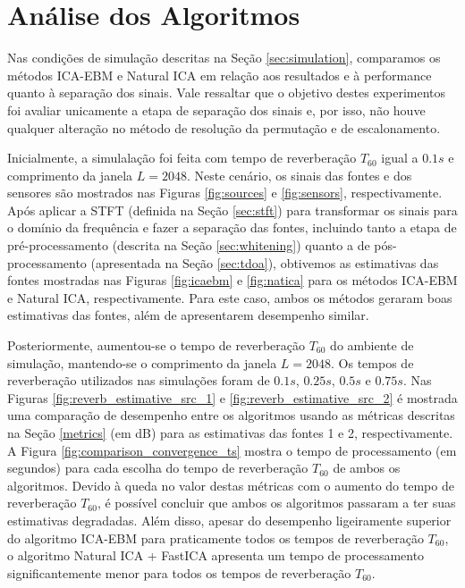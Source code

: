  \section{Análise dos Algoritmos}\label{sec:analysis}
    
    Nas condições de simulação descritas na Seção \ref{sec:simulation}, comparamos os métodos ICA-EBM e Natural ICA em relação aos resultados e à performance quanto à separação dos sinais. Vale ressaltar que o objetivo destes experimentos foi avaliar unicamente a etapa de separação dos sinais e, por isso, não houve qualquer alteração no método de resolução da permutação e de escalonamento. 
    
    Inicialmente, a simulalação foi feita com tempo de reverberação $T_{60}$ igual a $0.1s$ e comprimento da janela $L=2048$. Neste cenário, os sinais das fontes e dos sensores são mostrados nas Figuras \ref{fig:sources} e \ref{fig:sensors}, respectivamente. Após aplicar a STFT (definida na Seção \ref{sec:stft}) para transformar os sinais para o domínio da frequência e fazer a separação das fontes, incluindo tanto a etapa de pré-processamento (descrita na Seção \ref{sec:whitening}) quanto a de pós-processamento (apresentada na Seção \ref{sec:tdoa}), obtivemos as estimativas das fontes mostradas nas Figuras \ref{fig:icaebm} e \ref{fig:natica} para os métodos ICA-EBM e Natural ICA, respectivamente. Para este caso, ambos os métodos geraram boas estimativas das fontes, além de apresentarem desempenho similar.
    
    Posteriormente, aumentou-se o tempo de reverberação $T_{60}$ do ambiente de simulação, mantendo-se o comprimento da janela $L=2048$. Os tempos de reverberação utilizados nas simulações foram de $0.1s$, $0.25s$, $0.5s$ e $0.75s$. Nas Figuras \ref{fig:reverb_estimative_src_1} e \ref{fig:reverb_estimative_src_2} é mostrada uma comparação de desempenho entre os algoritmos usando as métricas descritas na Seção \ref{metrics} (em dB) para as estimativas das fontes 1 e 2, respectivamente. A Figura \ref{fig:comparison_convergence_ts} mostra o tempo de processamento (em segundos) para cada escolha do tempo de reverberação $T_{60}$ de ambos os algoritmos. Devido à queda no valor destas métricas com o aumento do tempo de reverberação $T_{60}$, é possível concluir que ambos os algoritmos passaram a ter suas estimativas degradadas. Além disso, apesar do desempenho ligeiramente superior do algoritmo ICA-EBM para praticamente todos os tempos de reverberação $T_{60}$, o algoritmo Natural ICA + FastICA apresenta um tempo de processamento significantemente menor para todos os tempos de reverberação $T_{60}$.
    
